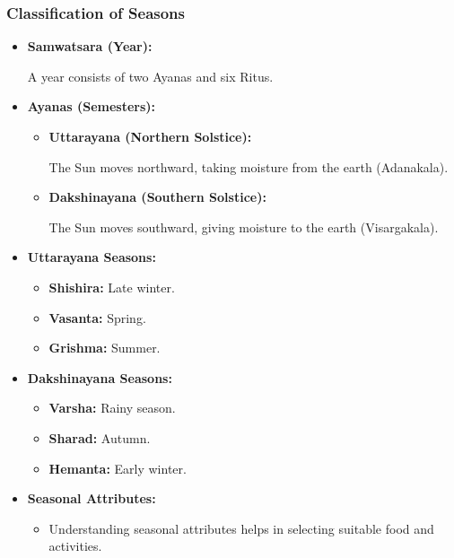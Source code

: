 \begin{frame}[fragile]\frametitle{Classification of Seasons}

      \begin{itemize}
        \item \textbf{Samwatsara (Year):} 
        
        A year consists of two Ayanas and six Ritus.
        
        \item \textbf{Ayanas (Semesters):} 
        \begin{itemize}
            \item \textbf{Uttarayana (Northern Solstice):}
            
            The Sun moves northward, taking moisture from the earth (Adanakala).
            
            \item \textbf{Dakshinayana (Southern Solstice):}
            
            The Sun moves southward, giving moisture to the earth (Visargakala).
            
        \end{itemize}
        \item \textbf{Uttarayana Seasons:}
        \begin{itemize}
            \item \textbf{Shishira:} Late winter.
            \item \textbf{Vasanta:} Spring.
            \item \textbf{Grishma:} Summer.
        \end{itemize}
        \item \textbf{Dakshinayana Seasons:}
        \begin{itemize}
            \item \textbf{Varsha:} Rainy season.
            \item \textbf{Sharad:} Autumn.
            \item \textbf{Hemanta:} Early winter.
        \end{itemize}
        \item \textbf{Seasonal Attributes:} 
        \begin{itemize}
            \item Understanding seasonal attributes helps in selecting suitable food and activities.
        \end{itemize}
      \end{itemize}

\end{frame}

